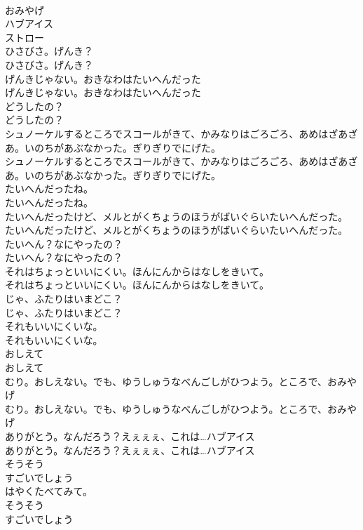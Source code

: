 \documentclass[8pt]{extreport}
\begin{document}
\begin{CJK}{UTF8}{min}
\\	おみやげ
\\	ハブアイス
\\	ストロー
\\	ひさびさ。げんき？
\\	ひさびさ。げんき？
\\	げんきじゃない。おきなわはたいへんだった
\\	げんきじゃない。おきなわはたいへんだった
\\	どうしたの？
\\	どうしたの？
\\	シュノーケルするところでスコールがきて、かみなりはごろごろ、あめはざあざあ。いのちがあぶなかった。ぎりぎりでにげた。
\\	シュノーケルするところでスコールがきて、かみなりはごろごろ、あめはざあざあ。いのちがあぶなかった。ぎりぎりでにげた。
\\	たいへんだったね。
\\	たいへんだったね。
\\	たいへんだったけど、メルとがくちょうのほうがばいぐらいたいへんだった。
\\	たいへんだったけど、メルとがくちょうのほうがばいぐらいたいへんだった。
\\	たいへん？なにやったの？
\\	たいへん？なにやったの？
\\	それはちょっといいにくい。ほんにんからはなしをきいて。
\\	それはちょっといいにくい。ほんにんからはなしをきいて。
\\	じゃ、ふたりはいまどこ？
\\	じゃ、ふたりはいまどこ？
\\	それもいいにくいな。
\\	それもいいにくいな。
\\	おしえて
\\	おしえて
\\	むり。おしえない。でも、ゆうしゅうなべんごしがひつよう。ところで、おみやげ
\\	むり。おしえない。でも、ゆうしゅうなべんごしがひつよう。ところで、おみやげ
\\	ありがとう。なんだろう？えぇぇぇ、これは…ハブアイス
\\	ありがとう。なんだろう？えぇぇぇ、これは…ハブアイス
\\	そうそう
\\	すごいでしょう
\\	はやくたべてみて。
\\	そうそう
\\	すごいでしょう

\end{CJK}
\end{document}
